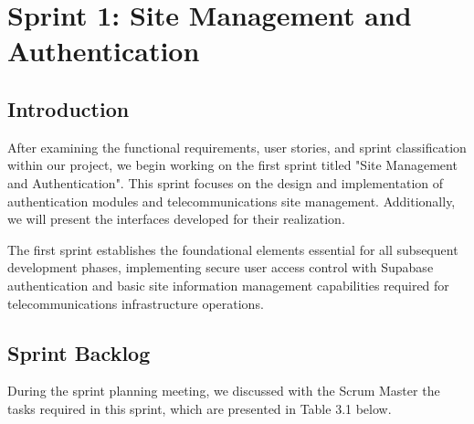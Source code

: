 \newpage

\chapter{Sprint 1: Site Management and Authentication}

\cfoot{\thepage}

\parindent=0.5in
\onehalfspacing

\section{Introduction}

After examining the functional requirements, user stories, and sprint classification within our project, we begin working on the first sprint titled "Site Management and Authentication". This sprint focuses on the design and implementation of authentication modules and telecommunications site management. Additionally, we will present the interfaces developed for their realization.

The first sprint establishes the foundational elements essential for all subsequent development phases, implementing secure user access control with Supabase authentication and basic site information management capabilities required for telecommunications infrastructure operations.

\section{Sprint Backlog}

During the sprint planning meeting, we discussed with the Scrum Master the tasks required in this sprint, which are presented in Table 3.1 below.

